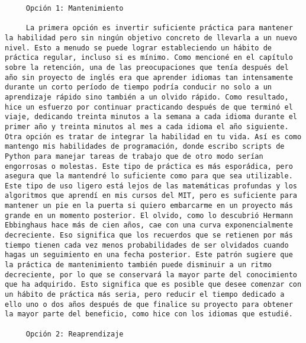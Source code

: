 \begin{verbatim}
	 Opción 1: Mantenimiento
	 
	 La primera opción es invertir suficiente práctica para mantener la habilidad pero sin ningún objetivo concreto de llevarla a un nuevo nivel. Esto a menudo se puede lograr estableciendo un hábito de práctica regular, incluso si es mínimo. Como mencioné en el capítulo sobre la retención, una de las preocupaciones que tenía después del año sin proyecto de inglés era que aprender idiomas tan intensamente durante un corto período de tiempo podría conducir no solo a un aprendizaje rápido sino también a un olvido rápido. Como resultado, hice un esfuerzo por continuar practicando después de que terminó el viaje, dedicando treinta minutos a la semana a cada idioma durante el primer año y treinta minutos al mes a cada idioma el año siguiente. Otra opción es tratar de integrar la habilidad en tu vida. Así es como mantengo mis habilidades de programación, donde escribo scripts de Python para manejar tareas de trabajo que de otro modo serían engorrosas o molestas. Este tipo de práctica es más esporádica, pero asegura que la mantendré lo suficiente como para que sea utilizable. Este tipo de uso ligero está lejos de las matemáticas profundas y los algoritmos que aprendí en mis cursos del MIT, pero es suficiente para mantener un pie en la puerta si quiero embarcarme en un proyecto más grande en un momento posterior. El olvido, como lo descubrió Hermann Ebbinghaus hace más de cien años, cae con una curva exponencialmente decreciente. Eso significa que los recuerdos que se retienen por más tiempo tienen cada vez menos probabilidades de ser olvidados cuando hagas un seguimiento en una fecha posterior. Este patrón sugiere que la práctica de mantenimiento también puede disminuir a un ritmo decreciente, por lo que se conservará la mayor parte del conocimiento que ha adquirido. Esto significa que es posible que desee comenzar con un hábito de práctica más seria, pero reducir el tiempo dedicado a ello uno o dos años después de que finalice su proyecto para obtener la mayor parte del beneficio, como hice con los idiomas que estudié.
	 
	 Opción 2: Reaprendizaje
	 

\end{verbatim}

